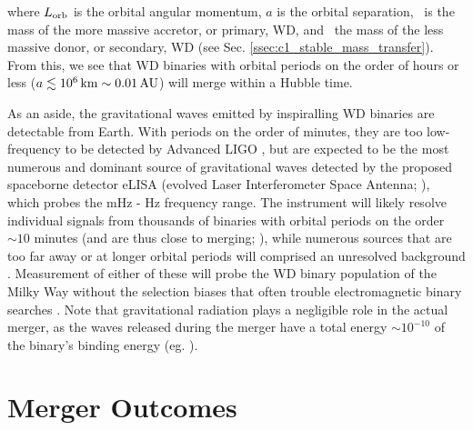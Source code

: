 \noindent where $L_\mathrm{orb}$ is the orbital angular momentum, $a$ is the orbital separation, \Ma\ is the mass of the more massive accretor, or primary, WD, and \Md\ the mass of the less massive donor, or secondary, WD (see Sec. \ref{ssec:c1_stable_mass_transfer}).  From this, we see that WD binaries with orbital periods on the order of hours or less ($a \lesssim 10^6\,\mathrm{km} \sim 0.01\,\mathrm{AU}$) will merge within a Hubble time.  


As an aside, the gravitational waves emitted by inspiralling WD binaries are detectable from Earth.  With periods on the order of minutes, they are too low-frequency to be detected by Advanced LIGO \citep{ligo+15}, but are expected to be the most numerous and dominant source of gravitational waves \citep{mars11} detected by the proposed spaceborne detector eLISA (evolved Laser Interferometer Space Antenna; \citealt{amar+13}), which probes the mHz - Hz frequency range.  The instrument will likely resolve individual signals from thousands of binaries with orbital periods on the order $\sim10$ minutes (and are thus close to merging; \citealt{amar+13, mars11, dan+11}), while numerous sources that are too far away or at longer orbital periods will comprised an unresolved background \citep{neleyp01,amar+13}.  Measurement of either of these will probe the WD binary population of the Milky Way without the selection biases that often trouble electromagnetic binary searches \citep{mars11}.  Note that gravitational radiation plays a negligible role in the actual merger, as the waves released during the merger have a total energy $\sim10^{-10}$ of the binary's binding energy (eg. \citealt{loreig09}).


\section{Merger Outcomes}
\label{sec:c1_mergeroutcomes}

